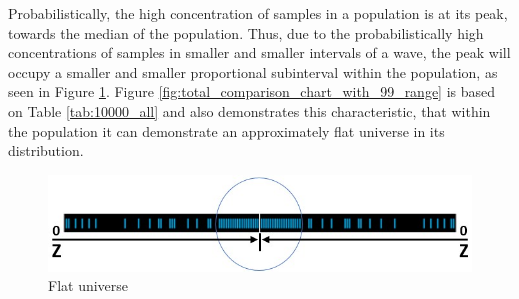 Probabilistically, the high concentration of samples in a population is at its peak, towards the median of the population. Thus, due to the probabilistically high concentrations of samples in smaller and smaller intervals of a wave, the peak will occupy a smaller and smaller proportional subinterval within the population, as seen in Figure \ref{fig:consciousness_flat_universe}. Figure \ref{fig:total_comparison_chart_with_99_range} is based on Table \ref{tab:10000_all} and also demonstrates this characteristic, that within the population it can demonstrate an approximately flat universe in its distribution.  
	\begin{figure}[H]
	\caption{Flat universe}
	\label{fig:consciousness_flat_universe}
	\centering
	\includegraphics[scale=.4]{sections/images/consciousness_flat_universe.jpg}
	\end{figure}

